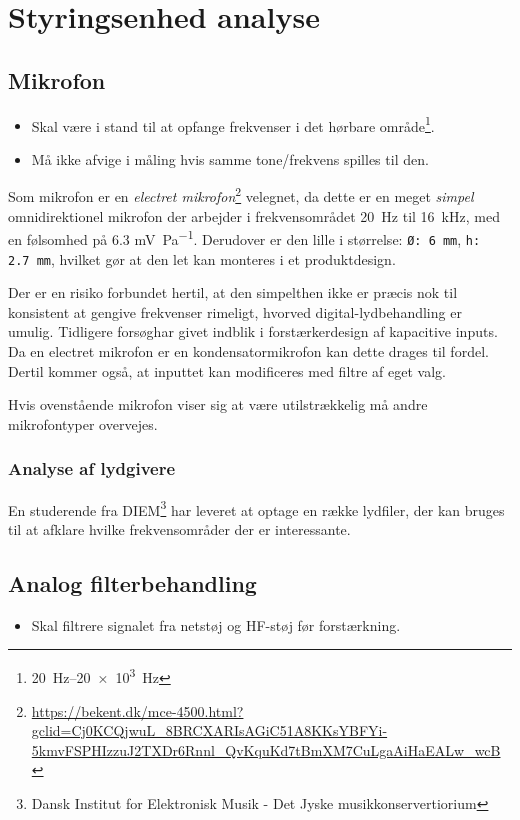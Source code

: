 \section {Styringsenhed analyse}
\subsection{Mikrofon}
\begin{itemize}
    \item Skal være i stand til at opfange frekvenser i det hørbare område\footnote{\SIrange{20}{20e3}{Hz}}. 
    \item Må ikke afvige i måling hvis samme tone/frekvens spilles til den. 
\end{itemize}
Som mikrofon er en \emph{electret mikrofon}\cite{CompleteECMGuide}\footnote{\url{https://bekent.dk/mce-4500.html?gclid=Cj0KCQjwuL_8BRCXARIsAGiC51A8KKsYBFYi-5kmvFSPHIzzuJ2TXDr6Rnnl_QvKquKd7tBmXM7CuLgaAiHaEALw_wcB}} velegnet, da dette er en meget \emph{simpel} omnidirektionel mikrofon der arbejder i frekvensområdet \SI{20}{Hz} til \SI{16}{kHz}, med en følsomhed på 6.3 \si{mV\per\pascal}. Derudover er den lille i størrelse: \texttt{Ø: \SI{6}{mm}}, \texttt{h: \SI{2.7}{mm}}, hvilket gør at den let kan monteres i et produktdesign\cite{MCE4500Datasheet}.


Der er en risiko forbundet hertil, at den simpelthen ikke er præcis nok til konsistent at gengive frekvenser rimeligt, hvorved digital-lydbehandling er umulig.
Tidligere forsøg\tbr har givet indblik i forstærkerdesign af kapacitive inputs.
Da en electret mikrofon er en kondensatormikrofon kan dette drages til fordel.
Dertil kommer også, at inputtet kan modificeres med filtre af eget valg.

Hvis ovenstående mikrofon viser sig at være utilstrækkelig må andre mikrofontyper overvejes\tbr.

\subsubsection{Analyse af lydgivere}
\tbd En studerende fra DIEM\footnote{Dansk Institut for Elektronisk Musik - Det Jyske musikkonservertiorium} har leveret at optage en række lydfiler, der kan bruges til at afklare hvilke frekvensområder der er interessante.


\subsection{Analog filterbehandling}
\begin{itemize}
    \item Skal filtrere signalet fra netstøj og HF-støj før forstærkning. 
\end{itemize}

